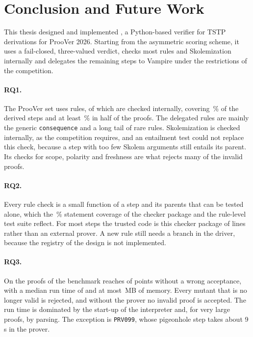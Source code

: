 \section{Conclusion and Future Work}
\label{sec:conclusion}

This thesis designed and implemented \TSTPy{}, a Python-based verifier for TSTP derivations for ProoVer 2026.
Starting from the asymmetric scoring scheme, it uses a fail-closed, three-valued verdict, checks most rules and Skolemization internally and delegates the remaining steps to Vampire under the restrictions of the competition.

\paragraph{RQ1.}
The ProoVer set uses \EvalRulesInSet{} rules, of which \EvalRulesInternal{} are checked internally, covering \EvalInternalPct\,\% of the derived steps and at least \EvalInternalMedianShare\,\% in half of the proofs.
The delegated rules are mainly the generic \texttt{consequence} and a long tail of rare rules.
Skolemization is checked internally, as the competition requires, and an entailment test could not replace this check, because a step with too few Skolem arguments still entails its parent. Its checks for scope, polarity and freshness are what rejects many of the invalid proofs.

\paragraph{RQ2.}
Every rule check is a small function of a step and its parents that can be tested alone, which the \EvalCheckerCov\,\% statement coverage of the checker package and the rule-level test suite reflect.
For most steps the trusted code is this checker package of \EvalCheckerLines{} lines rather than an external prover. A new rule still needs a branch in the driver, because the registry of the design is not implemented.

\paragraph{RQ3.}
On the \EvalOffN{} proofs of the benchmark \TSTPy{} reaches \EvalOffScore{} of \EvalOffMaxScore{} points without a wrong acceptance, with a median run time of \EvalWallMedian{} and at most \EvalRssMax\,MB of memory.
Every mutant that is no longer valid is rejected, and without the prover no invalid proof is accepted.
The run time is dominated by the start-up of the interpreter and, for very large proofs, by parsing. The exception is \texttt{PRV099}, whose pigeonhole step takes about 9\,s in the prover.

